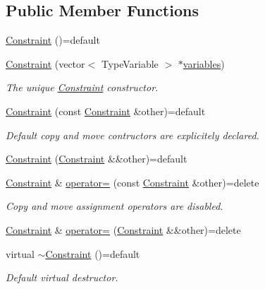 \subsection*{Public Member Functions}
\begin{DoxyCompactItemize}
\item 
\hyperlink{classghost_1_1Constraint_a7c214f85b51115ef3c32fb21ae90ec22}{Constraint} ()=default
\item 
\hyperlink{classghost_1_1Constraint_afe18954dbdd6fb0524121dc0776eb7f4}{Constraint} (vector$<$ Type\-Variable $>$ $\ast$\hyperlink{classghost_1_1Constraint_a83305933e19440f42428da0726261c4a}{variables})
\begin{DoxyCompactList}\small\item\em The unique \hyperlink{classghost_1_1Constraint}{Constraint} constructor. \end{DoxyCompactList}\item 
\hyperlink{classghost_1_1Constraint_a6c45c0eb8fda1f9b6d807989ec4958d9}{Constraint} (const \hyperlink{classghost_1_1Constraint}{Constraint} \&other)=default
\begin{DoxyCompactList}\small\item\em Default copy and move contructors are explicitely declared. \end{DoxyCompactList}\item 
\hyperlink{classghost_1_1Constraint_a1c2a42013e220dd0de9418d1f45ab902}{Constraint} (\hyperlink{classghost_1_1Constraint}{Constraint} \&\&other)=default
\item 
\hyperlink{classghost_1_1Constraint}{Constraint} \& \hyperlink{classghost_1_1Constraint_a1f5c217b260439b27f2dd0d9b30bdbc7}{operator=} (const \hyperlink{classghost_1_1Constraint}{Constraint} \&other)=delete
\begin{DoxyCompactList}\small\item\em Copy and move assignment operators are disabled. \end{DoxyCompactList}\item 
\hyperlink{classghost_1_1Constraint}{Constraint} \& \hyperlink{classghost_1_1Constraint_af0e96050c719fb50174e90ba14597d51}{operator=} (\hyperlink{classghost_1_1Constraint}{Constraint} \&\&other)=delete
\item 
virtual \hyperlink{classghost_1_1Constraint_aa5d5e4c15ad193621930156edf04bc5f}{$\sim$\-Constraint} ()=default
\begin{DoxyCompactList}\small\item\em Default virtual destructor. \end{DoxyCompactList}\item 

\end{DoxyCompactItemize}
